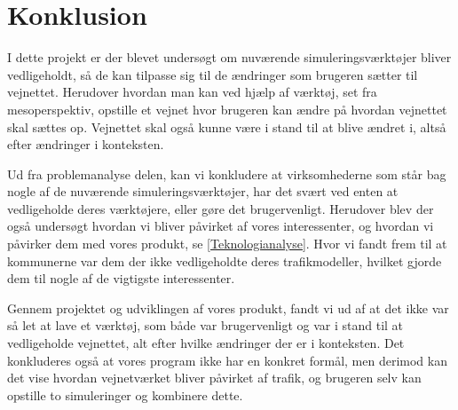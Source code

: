 \chapter{Konklusion}

I dette projekt er der blevet undersøgt om nuværende simuleringsværktøjer bliver vedligeholdt, så de kan tilpasse sig til de ændringer som brugeren sætter til vejnettet. Herudover hvordan man kan ved hjælp af værktøj, set fra mesoperspektiv, opstille et vejnet hvor brugeren kan ændre på hvordan vejnettet skal sættes op. Vejnettet skal også kunne være i stand til at blive ændret i, altså efter ændringer i konteksten.  

\vspace{5mm}

Ud fra problemanalyse delen, kan vi konkludere at virksomhederne som står bag nogle af de nuværende simuleringsværktøjer, har det svært ved enten at vedligeholde deres værktøjere, eller gøre det brugervenligt. Herudover blev der også undersøgt hvordan vi bliver påvirket af vores interessenter, og hvordan vi påvirker dem med vores produkt, se \ref{Teknologianalyse}. Hvor vi fandt frem til at kommunerne var dem der ikke vedligeholdte deres trafikmodeller, hvilket gjorde dem til nogle af de vigtigste interessenter. 

\vspace{5mm}

Gennem projektet og udviklingen af vores produkt, fandt vi ud af at det ikke var så let at lave et værktøj, som både var brugervenligt og var i stand til at vedligeholde vejnettet, alt efter hvilke ændringer der er i konteksten. Det konkluderes også at vores program ikke har en konkret formål, men derimod kan det vise hvordan vejnetværket bliver påvirket af trafik, og brugeren selv kan opstille to simuleringer og kombinere dette.
